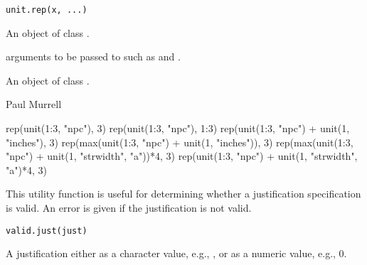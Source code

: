%
\begin{Usage}
\begin{verbatim}
unit.rep(x, ...)
\end{verbatim}
\end{Usage}
%
\begin{Arguments}
\begin{ldescription}
\item[\code{x}]  An object of class . 
\item[\code{...}] arguments to be passed to  such as
 and .
\end{ldescription}
\end{Arguments}
%
\begin{Value}
An object of class .
\end{Value}
%
\begin{Author}\relax
 Paul Murrell 
\end{Author}
%
\begin{SeeAlso}\relax
{}
\end{SeeAlso}
%
\begin{Examples}
\begin{ExampleCode}
rep(unit(1:3, "npc"), 3)
rep(unit(1:3, "npc"), 1:3)
rep(unit(1:3, "npc") + unit(1, "inches"), 3)
rep(max(unit(1:3, "npc") + unit(1, "inches")), 3)
rep(max(unit(1:3, "npc") + unit(1, "strwidth", "a"))*4, 3)
rep(unit(1:3, "npc") + unit(1, "strwidth", "a")*4, 3)
\end{ExampleCode}
\end{Examples}
%
\begin{Description}\relax
This utility function is useful for determining
whether a justification specification is valid.
An error is given if the justification is not valid.
\end{Description}
%
\begin{Usage}
\begin{verbatim}
valid.just(just)
\end{verbatim}
\end{Usage}
%
\begin{Arguments}
\begin{ldescription}
\item[\code{just}] A justification either as a character value,
e.g., , or as a numeric value, e.g., 0.
\end{ldescription}
\end{Arguments}
